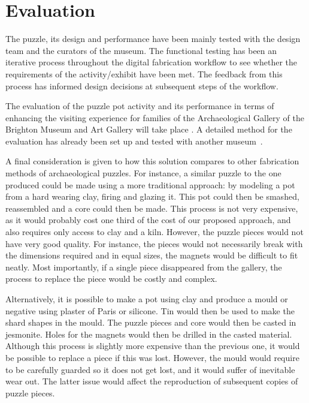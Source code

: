 \documentclass[acmlarge,screen,dvipsnames]{acmart}
\begin{document}
\section{Evaluation}
\label{eva}

The puzzle, its design and performance have been mainly tested with
the design team and the curators of the museum. The functional testing
has been an iterative process throughout the digital fabrication
workflow to see whether the requirements of the activity/exhibit have
been met. The feedback from this process has informed design decisions
at subsequent steps of the workflow.

The evaluation of the puzzle pot activity and its performance in terms
of enhancing the visiting experience for families of the
Archaeological Gallery of the Brighton Museum and Art Gallery will
take place . A detailed method
for the evaluation has already been set up and tested with another
museum~\cite{Samaroudi2017}.

A final consideration is given to how this solution compares to other
fabrication methods of archaeological puzzles. For instance, a similar
puzzle to the one produced could be made using a more traditional
approach: by modeling a pot from a hard wearing clay, firing and
glazing it. This pot could then be smashed, reassembled and a core
could then be made. This process is not very expensive, as it would
probably cost one third of the cost of our proposed approach, and also
requires only access to clay and a kiln. However, the puzzle pieces
would not have very good quality. For instance, the pieces would not
necessarily break with the dimensions required and in equal sizes, the
magnets would be difficult to fit neatly. Most importantly, if a
single piece disappeared from the gallery, the process to replace the
piece would be costly and complex.

Alternatively, it is possible to make a pot using clay and produce a
mould or negative using plaster of Paris or silicone. Tin would then
be used to make the shard shapes in the mould. The puzzle pieces and
core would then be casted in jesmonite. Holes for the magnets would
then be drilled in the casted material. Although this process is
slightly more expensive than the previous one, it would be possible to
replace a piece if this was lost. However, the mould would require to
be carefully guarded so it does not get lost, and it would suffer of
inevitable wear out. The latter issue would affect the reproduction of
subsequent copies of puzzle pieces.
\end{document}
